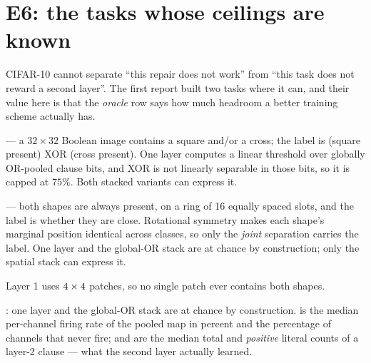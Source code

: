 \section{E6: the tasks whose ceilings are known}
\label{sec:synthetic}

CIFAR-10 cannot separate ``this repair does not work'' from ``this task does not reward a
second layer''. The first report built two tasks where it can, and their value here is that
the \emph{oracle} row says how much headroom a better training scheme actually has.

 --- a $32\times32$ Boolean image contains a square and/or a cross; the label
is (square present) XOR (cross present). One layer computes a linear threshold over globally
OR-pooled clause bits, and XOR is not linearly separable in those bits, so it is capped at
$75\%$. Both stacked variants can express it.

 --- both shapes are always present, on a ring of 16 equally spaced slots,
and the label is whether they are close. Rotational symmetry makes each shape's marginal
position identical across classes, so only the \emph{joint} separation carries the label. One
layer and the global-OR stack are at chance by construction; only the spatial stack can
express it.

Layer 1 uses $4\times4$ patches, so no single patch ever contains both shapes.

\newcommand{\syntable}[3]{%
\begin{table}[h]
\centering\small
\caption{#2}
\label{#3}
\pgfplotstabletypeset[
  col sep=comma, string type,
  every head row/.style={before row=\ttoprule, after row=\ttmidrule},
  every last row/.style={after row=\ttbotrule},
  columns={label,fire,dead,l2size,l2pos,acc,sd},
  columns/label/.style={column name=\thead{arm}, column type={l}},
  columns/fire/.style={column name=\thead{L1 fire}, column type={r}},
  columns/dead/.style={column name=\thead{L1 dead}, column type={r}},
  columns/l2size/.style={column name=\thead{L2 size}, column type={r}},
  columns/l2pos/.style={column name=\thead{L2 pos}, column type={r}},
  columns/acc/.style={column name=\thead{test acc (\%)}, column type={r}},
  columns/sd/.style={column name=\thead{$\pm$}, column type={r}},
]{#1}
\end{table}}

\syntable{data/syn_near.csv}{: one layer and the global-OR stack are at chance by
construction. \code{L1 fire} is the median per-channel firing rate of the pooled map in
percent and \code{L1 dead} the percentage of channels that never fire; \code{L2 size} and
\code{L2 pos} are the median total and \emph{positive} literal counts of a layer-2 clause ---
what the second layer actually learned.}{tab:synnear}


